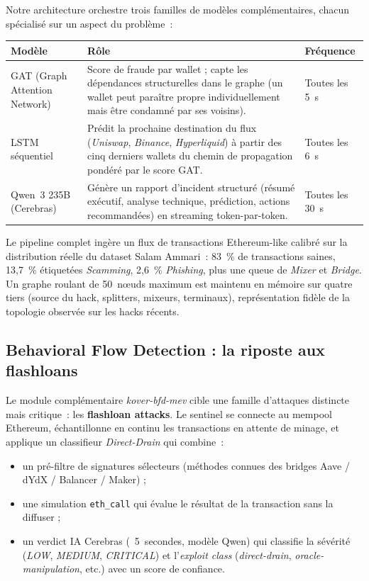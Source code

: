\documentclass[11pt,a4paper]{article}
\begin{document}
Notre architecture orchestre trois familles de modèles complémentaires,
chacun spécialisé sur un aspect du problème~:

\begin{tabularx}{\linewidth}{@{}lXl@{}}
\toprule
\textbf{Modèle} & \textbf{Rôle} & \textbf{Fréquence} \\
\midrule
GAT (Graph Attention Network) &
Score de fraude par wallet ; capte les dépendances structurelles
dans le graphe (un wallet peut paraître propre individuellement mais
être condamné par ses voisins). &
Toutes les 5~s \\
\addlinespace
LSTM séquentiel &
Prédit la prochaine destination du flux (\emph{Uniswap},
\emph{Binance}, \emph{Hyperliquid}) à partir des cinq derniers wallets
du chemin de propagation pondéré par le score GAT. &
Toutes les 6~s \\
\addlinespace
Qwen~3 235B (Cerebras) &
Génère un rapport d'incident structuré (résumé exécutif, analyse
technique, prédiction, actions recommandées) en streaming
token-par-token. &
Toutes les 30~s \\
\bottomrule
\end{tabularx}

\medskip

Le pipeline complet ingère un flux de transactions Ethereum-like
calibré sur la distribution réelle du dataset Salam Ammari~: 83~\% de
transactions saines, 13,7~\% étiquetées \emph{Scamming}, 2,6~\%
\emph{Phishing}, plus une queue de \emph{Mixer} et \emph{Bridge}. Un
graphe roulant de 50~nœuds maximum est maintenu en mémoire sur
quatre tiers (source du hack, splitters, mixeurs, terminaux),
représentation fidèle de la topologie observée sur les hacks récents.

\subsection{Behavioral Flow Detection : la riposte aux flashloans}

Le module complémentaire \emph{kover-bfd-mev} cible une famille
d'attaques distincte mais critique~: les \textbf{flashloan attacks}.
Le sentinel se connecte au mempool Ethereum, échantillonne en continu
les transactions en attente de minage, et applique un classifieur
\emph{Direct-Drain} qui combine~:

\begin{itemize}
  \item un pré-filtre de signatures sélecteurs (méthodes connues des
        bridges Aave / dYdX / Balancer / Maker) ;
  \item une simulation \texttt{eth\_call} qui évalue le résultat de la
        transaction sans la diffuser ;
  \item un verdict IA Cerebras (~5~secondes, modèle Qwen) qui classifie
        la sévérité (\emph{LOW}, \emph{MEDIUM}, \emph{CRITICAL}) et
        l'\emph{exploit class} (\emph{direct-drain},
        \emph{oracle-manipulation}, etc.) avec un score de confiance.
\end{itemize}
\end{document}
